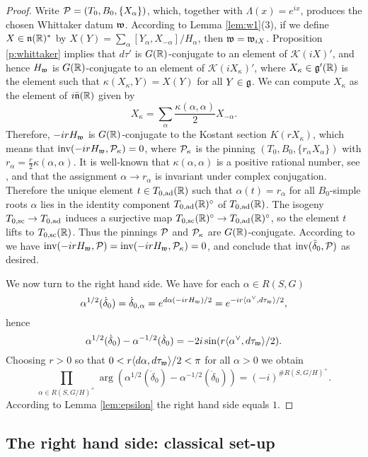\documentclass{article}
\theoremstyle{definition}
\numberwithin{equation}{section}
\renewcommand{\-}{\hyp{}}
\newcommand{\K}{\mathcal K}
\begin{document}
\begin{proof}
Write $\mathcal{P}=(T_0,B_0,\{X_\alpha\})$, which, together with $\Lambda(x)=e^{ix}$, produces the chosen Whittaker datum $\mathfrak{w}$. According to Lemma \ref{lem:w1}(3), if we define $X \in \mathfrak{n}(\mathbb{R})^*$ by $X(Y) = \sum_\alpha [Y_\alpha,X_{-\alpha}]/H_\alpha$, then $\mathfrak{w}=\mathfrak{w}_{iX}$. Proposition \ref{p:whittaker} implies that $d\tau'$ is $G(\mathbb{R})$-conjugate to an element of $\K(iX)'$, and hence $H_{\mathfrak{w}}$ is $G(\mathbb{R})$-conjugate to an element of $\K(iX_\kappa)'$, where $X_\kappa \in \mathfrak{g}'(\mathbb{R})$ is the element such that $\kappa(X_\kappa,Y)=X(Y)$ for all $Y \in \mathfrak{g}$. We can compute $X_\kappa$ as the element of $i\mathfrak{\bar n}(\mathbb{R})$ given by
\[ X_\kappa = \sum_\alpha \frac{\kappa(\alpha,\alpha)}{2} X_{-\alpha}. \]
Therefore, $-irH_{\mathfrak{w}}$ is $G(\mathbb{R})$-conjugate to the Kostant section $K(rX_\kappa)$, which means that $\textrm{inv}(-irH_{\mathfrak{w}},\mathcal{P}_\kappa)=0$, where $\mathcal{P}_\kappa$ is the pinning $(T_0,B_0,\{r_\alpha X_\alpha\})$ with $r_\alpha = \tfrac{r}{2}\kappa(\alpha,\alpha)$. It is well-known that $\kappa(\alpha,\alpha)$ is a positive rational number, see \cite[\S8.5]{Humphreys80}, and that the assignment $\alpha \to r_\alpha$ is invariant under complex conjugation. Therefore the unique element  $t \in T_{0,\textrm{ad}}(\mathbb{R})$ such that $\alpha(t)=r_\alpha$ for all $B_0$-simple roots $\alpha$ lies in the identity component $T_{0,\textrm{ad}}(\mathbb{R})^\circ$ of $T_{0,\textrm{ad}}(\mathbb{R})$. The isogeny $T_{0,\textrm{sc}} \to T_{0,\textrm{ad}}$ induces a surjective map $T_{0,\textrm{sc}}(\mathbb{R})^\circ \to T_{0,\textrm{ad}}(\mathbb{R})^\circ$, so the element $t$ lifts to $T_{0,\textrm{sc}}(\mathbb{R})$. Thus the pinnings $\mathcal{P}$ and $\mathcal{P}_\kappa$ are $G(\mathbb{R})$-conjugate. According to \cite[Lemma 4.1.4]{KalHDC} we have $\textrm{inv}(-irH_{\mathfrak{w}},\mathcal{P})=\textrm{inv}(-irH_{\mathfrak{w}},\mathcal{P}_\kappa)=0$, and conclude that $\textrm{inv}(\ddot\delta_0,\mathcal{P})$ as desired.

We now turn to the right hand side. We have for each $\alpha \in R(S,G)$
\[ \alpha^{1/2}(\dot\delta_0)=\dot\delta_{0,\alpha} = e^{d\alpha(-irH_{\mathfrak{w}})/2}=e^{-ir\langle\alpha^\vee,d\tau_{\mathfrak{w}}\rangle/2},\]
hence
\[ \alpha^{1/2}(\dot\delta_0)-\alpha^{-1/2}(\dot\delta_0) = -2i\sin(r\langle\alpha^\vee,d\tau_{\mathfrak{w}}\rangle/2). \]
Choosing $r>0$ so that $0<r\langle d\alpha,d\tau_{\mathfrak{w}}\rangle/2 < \pi$ for all $\alpha>0$ we obtain
\[ \prod_{\alpha \in R(S,G/H)^+}\arg(\alpha^{1/2}(\dot\delta_0) - \alpha^{-1/2}(\dot\delta_0)) = (-i)^{\#R(S,G/H)^+}. \]
According to Lemma \ref{lem:epsilon} the right hand side equals $1$.
\end{proof}

\subsection{The right hand side: classical set-up}
\end{document}
